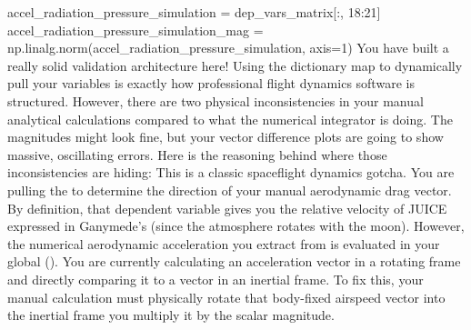 {}accel_radiation_pressure_simulation = dep_vars_matrix[:, 18:21] accel_radiation_pressure_simulation_mag = np.linalg.norm(accel_radiation_pressure_simulation, axis=1)\markdownRendererInterblockSeparator
{}
\markdownRendererSectionEnd \markdownRendererSectionBegin
{}\markdownRendererInterblockSeparator
{}\markdownRendererSectionBegin
{}\markdownRendererInterblockSeparator
{}You have built a really solid validation architecture here! Using the dictionary map to dynamically pull your variables is exactly how professional flight dynamics software is structured.\markdownRendererInterblockSeparator
{}However, there are two physical inconsistencies in your manual analytical calculations compared to what the numerical integrator is doing. The magnitudes might look fine, but your vector difference plots are going to show massive, oscillating errors.\markdownRendererInterblockSeparator
{}Here is the reasoning behind where those inconsistencies are hiding:\markdownRendererInterblockSeparator
{}\markdownRendererSectionBegin
{}\markdownRendererInterblockSeparator
{}This is a classic spaceflight dynamics gotcha. You are pulling the  to determine the direction of your manual aerodynamic drag vector.\markdownRendererInterblockSeparator
{}By definition, that dependent variable gives you the relative velocity of JUICE expressed in Ganymede's  (since the atmosphere rotates with the moon). However, the numerical aerodynamic acceleration you extract from  is evaluated in your global  ().\markdownRendererInterblockSeparator
{}You are currently calculating an acceleration vector in a rotating frame and directly comparing it to a vector in an inertial frame. To fix this, your manual calculation must physically rotate that body-fixed airspeed vector into the inertial frame  you multiply it by the scalar magnitude.\markdownRendererInterblockSeparator
{}
\markdownRendererSectionEnd \markdownRendererSectionBegin
{}\markdownRendererInterblockSeparator
